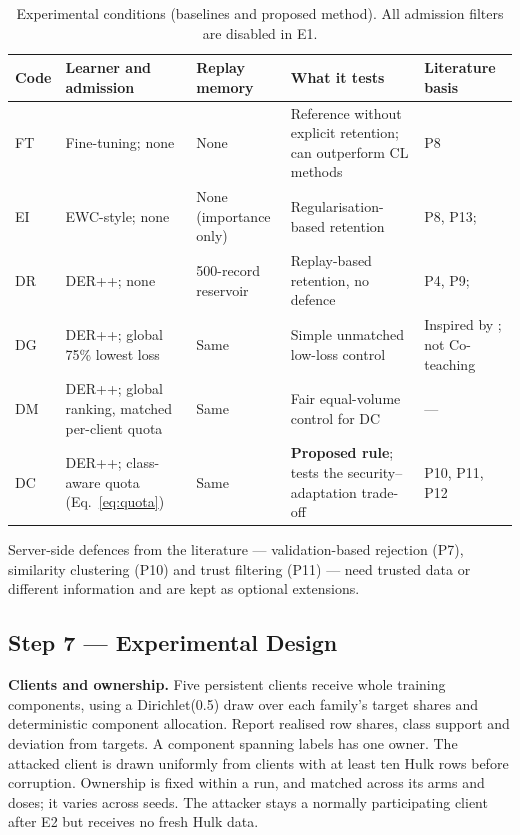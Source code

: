 \documentclass[10pt,a4paper]{article}
\begin{document}
\begin{table}[H]
\centering\footnotesize
\caption{Experimental conditions (baselines and proposed method). All admission filters are disabled in E1.}
\label{tab:arms}
\begin{tabularx}{\linewidth}{L{0.9cm}L{3.4cm}L{3.0cm}Y L{2.4cm}}
\toprule
Code & Learner and admission & Replay memory & What it tests & Literature basis\\
\midrule
FT & Fine-tuning; none & None & Reference without explicit retention; can outperform CL methods & P8\\
EI & EWC-style; none & None (importance only) & Regularisation-based retention & P8, P13; \cite{ewc}\\
DR & DER++; none & 500-record reservoir & Replay-based retention, no defence & P4, P9; \cite{der}\\
DG & DER++; global 75\% lowest loss & Same & Simple unmatched low-loss control & Inspired by \cite{coteach}; not Co-teaching\\
DM & DER++; global ranking, matched per-client quota & Same & Fair equal-volume control for DC & ---\\
DC & DER++; class-aware quota (Eq.~\ref{eq:quota}) & Same & \textbf{Proposed rule}; tests the security--adaptation trade-off & P10, P11, P12\\
\bottomrule
\end{tabularx}
\end{table}
Server-side defences from the literature --- validation-based rejection (P7), similarity clustering (P10) and trust filtering (P11) --- need trusted data or different information and are kept as optional extensions.

\subsection{Step 7 --- Experimental Design}
\textbf{Clients and ownership.} Five persistent clients receive whole training components, using a Dirichlet(0.5) draw over each family's target shares and deterministic component allocation. Report realised row shares, class support and deviation from targets. A component spanning labels has one owner. The attacked client is drawn uniformly from clients with at least ten Hulk rows before corruption. Ownership is fixed within a run, and matched across its arms and doses; it varies across seeds. The attacker stays a normally participating client after E2 but receives no fresh Hulk data.
\end{document}
